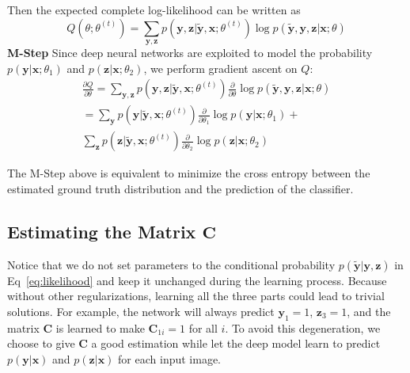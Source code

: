 \documentclass[10pt,twocolumn,letterpaper]{article}
\def\vec{\mathbf}
\def\mat{\mathbf}
\begin{document}
Then the expected complete log-likelihood can be written as
\begin{equation}
    Q(\theta; \theta^{(t)}) = \sum_{\vec{y},\vec{z}} p(\vec{y}, \vec{z} | \tilde{\vec{y}}, \vec{x}; \theta^{(t)}) \log p(\tilde{\vec{y}}, \vec{y}, \vec{z} | \vec{x}; \theta)
\end{equation}
\textbf{M-Step} Since deep neural networks are exploited to model the probability $p(\vec{y}|\vec{x};\theta_1)$ and $p(\vec{z}|\vec{x};\theta_2)$, we perform gradient ascent on $Q$:
\begin{multline} \label{eq:gradient}
    \frac{\partial Q}{\partial \theta} = \sum_{\vec{y},\vec{z}} p(\vec{y}, \vec{z} | \tilde{\vec{y}}, \vec{x}; \theta^{(t)}) \frac{\partial}{\partial \theta} \log p(\tilde{\vec{y}}, \vec{y}, \vec{z} | \vec{x}; \theta) \\
    = \sum_{\vec{y}} p(\vec{y} | \tilde{\vec{y}}, \vec{x}; \theta^{(t)}) \frac{\partial}{\partial \theta_1} \log p(\vec{y}|\vec{x};\theta_1) + \\
      \sum_{\vec{z}} p(\vec{z} | \tilde{\vec{y}}, \vec{x}; \theta^{(t)}) \frac{\partial}{\partial \theta_2} \log p(\vec{z}|\vec{x};\theta_2)
\end{multline}

The M-Step above is equivalent to minimize the cross entropy between the estimated ground truth distribution and the prediction of the classifier.

\subsection{Estimating the Matrix $\mat{C}$} %
\label{sub:confusion_estimation}
Notice that we do not set parameters to the conditional probability $p(\tilde{\vec{y}}|\vec{y},\vec{z})$ in Eq~\eqref{eq:likelihood} and keep it unchanged during the learning process. Because without other regularizations, learning all the three parts could lead to trivial solutions. For example, the network will always predict $\vec{y}_1 = 1$, $\vec{z}_3 = 1$, and the matrix $\mat{C}$ is learned to make $\mat{C}_{1i} = 1$ for all $i$. To avoid this degeneration, we choose to give $\mat{C}$ a good estimation while let the deep model learn to predict $p(\vec{y} | \vec{x})$ and $p(\vec{z} | \vec{x})$ for each input image.
\end{document}
